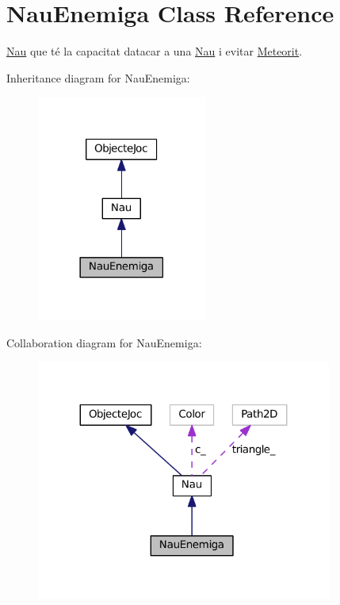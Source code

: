 \hypertarget{class_nau_enemiga}{}\section{Nau\+Enemiga Class Reference}
\label{class_nau_enemiga}


\hyperlink{class_nau}{Nau} que té la capacitat d\textquotesingle{}atacar a una \hyperlink{class_nau}{Nau} i evitar \hyperlink{class_meteorit}{Meteorit}.  




Inheritance diagram for Nau\+Enemiga\+:\nopagebreak
\begin{figure}[H]
\begin{center}
\leavevmode
\includegraphics[width=158pt]{class_nau_enemiga__inherit__graph}
\end{center}
\end{figure}


Collaboration diagram for Nau\+Enemiga\+:\nopagebreak
\begin{figure}[H]
\begin{center}
\leavevmode
\includegraphics[width=275pt]{class_nau_enemiga__coll__graph}
\end{center}
\end{figure}
